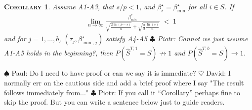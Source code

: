 \documentclass[aos]{imsart}
\theoremstyle{plain}
\newtheorem{cor}{\textsc{Corollary}}[section]
\newcommand{\david}[1]{{\small{\color{blue} \sf $\heartsuit$ David: #1}}}
\newcommand{\piotr}[1]{{\small{\color{red} \sf $\clubsuit$ Piotr: #1}}}
\newcommand{\paul}[1]{{\small{\color{green} \sf $\spadesuit$ Paul: #1}}}
\begin{document}
\begin{cor}\label{cor:selconstimpossible}
Assume A1-A3, that $s/p<1$, and $\beta^{\star}_i=\beta_{\min}^{\star}$ for all $i \in S$. If
\begin{align*}
    &\lim_{n\to \infty}\frac{\beta_{\min}^*}{\sqrt{\tfrac{2\ln(p-s)}{n}}+\sqrt{\tfrac{\pi}{2}\tfrac{\ln(s)}{n}}}\;<\; 1 
\end{align*}
and for $j=1,\ldots,b$, $(\tau_j,\beta^\star_{\min,j})$ satisfy A4-A5 \piotr{Cannot we just assume A1-A5 holds in the beginning?},
then 
$P(\hat{S}^{T,1} = S)\not \to 1$ and $P(\hat{S}^{T,b} = S)\to 1$.
\end{cor}
\paul{Do I need to have proof or can we say it is immediate?} \david{I normally err on the cautious side and add a brief proof where I say "The result follows immediately from..."}\piotr{If you call it ``Corollary'' perhaps fine to skip the proof. But you can write a sentence below just to guide readers.}
\end{document}
